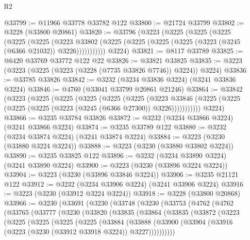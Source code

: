 \begin{lexlean}{R2}
\begin{coremodule}
@33799 := @11966 @33778 @33782 @122
@33800 := @21724 @33799
@33802 := @3228 (@33800 @20861)
@33820 := @33796
    (@3223
      (@3225
        (@3225
          (@3225
            (@3225
              (@3225
                (@3223
                  @33802
                  (@3225 (@3225 (@3225 (@3225 (@3223 (@3245 (@6366 @21032)) @3226)))))))))))
      @3224)
@33821 := @8117 @33789
@33825 := @6420 @33769 @33772 @122 @22
@33826 := @33821 @33825
@33835 := @3223 (@3223 (@3225 (@3223 (@3228 (@7735 @33826 @7746)) @3224)) @3224)
@33836 := @33785 @33826
@33842 := @3232 (@3234 @33836 @3224) (@3241 @33836 @3224)
@33846 := @4760 (@33041 @33799 @20861 @21246)
@33864 := @33842
    (@3223
      (@3225
        (@3225
          (@3225
            (@3225
              (@3225
                (@3223
                  @33846
                  (@3225 (@3225 (@3225 (@3225 (@3223 (@3245 (@6366 @27300)) @3226)))))))))))
      @3224)
@33866 := @3235 @33784 @33826
@33872 := @3232 (@3234 @33866 @3224) (@3241 @33866 @3224)
@33874 := @3235 @33789 @122
@33880 := @3232 (@3234 @33874 @3224) (@3241 @33874 @3224)
@33884 := @3223 (@3230 (@33880 @3224 @3224))
@33888 := @3223 (@3230 (@33880 @33802 @3224))
@33890 := @3235 @33825 @122
@33896 := @3232 (@3234 @33890 @3224) (@3241 @33890 @3224)
@33900 := @3223 (@3230 (@33896 @3224 @3224))
@33904 := @3223 (@3230 (@33896 @33846 @3224))
@33906 := @3235 @21121 @122
@33912 := @3232 (@3234 @33906 @3224) (@3241 @33906 @3224)
@33916 := @3223 (@3230 (@33912 @3224 @3224))
@33918 := @3228 (@33800 @20868)
@33966 := @3230
    (@33691
      (@3230
        (@33748
          (@3230
            (@33753
              (@4762
                (@4762
                  (@33765
                    (@33777
                      (@3230
                        (@33820
                          (@33835
                            (@33864
                              (@33835
                                (@33872
                                  (@3223
                                    (@3225
                                      (@3225
                                        (@3225
                                          (@3225
                                            (@33884
                                              (@33888
                                                (@33900
                                                  (@33904
                                                    (@33916
                                                      (@3223
                                                        (@3230 (@33912 @33918 @3224))
                                                        @3227))))))))))

\end{coremodule}
\end{lexlean}
